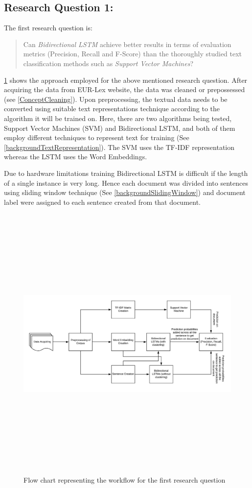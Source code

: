 \subsection{Research Question 1:} \label{question1}
The first research question is:
\begin{quote}
    Can \textit{Bidirectional LSTM} achieve better results in terms of evaluation metrics (Precision, Recall and F-Score) than the thoroughly studied text classification methods such as \textit{Support Vector Machines}?
\end{quote}

\ref{fig:FlowResearchQuestion1} shows the approach employed for the above mentioned research question. After acquiring the data from EUR-Lex website, the data was cleaned or prepossessed (see \ref{ConceptCleaning}). Upon preprocessing, the textual data needs to be converted using suitable text representations technique according to the algorithm it will be trained on. Here, there are two algorithms being tested, Support Vector Machines (SVM) and Bidirectional LSTM, and both of them employ different techniques to represent text for training (See \ref{backgroundTextRepresentation}). The SVM uses the TF-IDF representation whereas the LSTM uses the Word Embeddings. 
 
Due to hardware limitations training Bidirectional LSTM is difficult if the length of a single instance is very long. Hence each document was divided into sentences using sliding window technique (See \ref{backgroundSlidingWindow}) and document label were assigned to each sentence created from that document. 

\begin{figure}[!ht]
    \centering
    \includegraphics[width=15cm, height=14cm,keepaspectratio]{pics/flowforQuestion1.jpeg}
    \caption{Flow chart representing the workflow for the first research question }
    \label{fig:FlowResearchQuestion1}
\end{figure}

